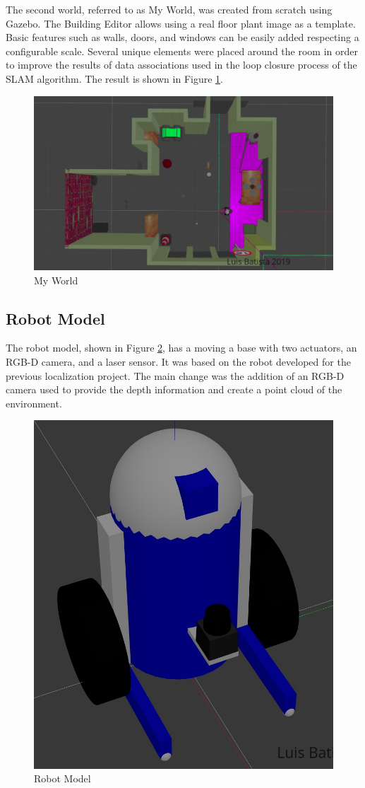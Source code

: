 \documentclass[10pt,journal,compsoc]{IEEEtran}
\begin{document}
The second world, referred to as My World, was created from scratch using Gazebo. The Building Editor allows using a real floor plant image as a template. Basic features such as walls, doors, and windows can be easily added respecting a configurable scale.  
Several unique elements were placed around the room in order to improve the results of data associations used in the loop closure process of the SLAM algorithm. The result is shown in Figure \ref{fig:my-world}.

\begin{figure}[H]
  \includegraphics[width=\linewidth]{my_world.png}
  \caption{My World}
  \label{fig:my-world}
\end{figure}


\subsection{Robot Model}

The robot model, shown in Figure \ref{fig:robot-model}, has a moving a base with two actuators, an RGB-D camera, and a laser sensor. It was based on the robot developed for the previous localization project. The main change was the addition of an RGB-D camera used to provide the depth information and create a point cloud of the environment.

\begin{figure}[H]
  \centering
  \includegraphics[width=.5\linewidth]{robot_model.png}
  \caption{Robot Model}
  \label{fig:robot-model}
\end{figure}
\end{document}
